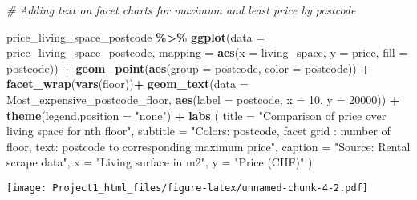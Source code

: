 \documentclass[
]{article}
\newenvironment{Shaded}{\begin{snugshade}}{\end{snugshade}}
\newcommand{\AttributeTok}[1]{\textcolor[rgb]{0.13,0.29,0.53}{#1}}
\newcommand{\CommentTok}[1]{\textcolor[rgb]{0.56,0.35,0.01}{\textit{#1}}}
\newcommand{\DecValTok}[1]{\textcolor[rgb]{0.00,0.00,0.81}{#1}}
\newcommand{\FunctionTok}[1]{\textcolor[rgb]{0.13,0.29,0.53}{\textbf{#1}}}
\newcommand{\NormalTok}[1]{#1}
\newcommand{\SpecialCharTok}[1]{\textcolor[rgb]{0.81,0.36,0.00}{\textbf{#1}}}
\newcommand{\StringTok}[1]{\textcolor[rgb]{0.31,0.60,0.02}{#1}}
\begin{document}
\begin{Shaded}
\begin{Highlighting}[]
\CommentTok{\# Adding text on facet charts for maximum and least price by postcode}

\NormalTok{price\_living\_space\_postcode }\SpecialCharTok{\%\textgreater{}\%}
  \FunctionTok{ggplot}\NormalTok{(}\AttributeTok{data =}\NormalTok{ price\_living\_space\_postcode,}
         \AttributeTok{mapping =} \FunctionTok{aes}\NormalTok{(}\AttributeTok{x =}\NormalTok{ living\_space, }\AttributeTok{y =}\NormalTok{ price, }\AttributeTok{fill =}\NormalTok{ postcode)) }\SpecialCharTok{+}
  \FunctionTok{geom\_point}\NormalTok{(}\FunctionTok{aes}\NormalTok{(}\AttributeTok{group =}\NormalTok{ postcode, }\AttributeTok{color =}\NormalTok{ postcode)) }\SpecialCharTok{+} \FunctionTok{facet\_wrap}\NormalTok{(}\FunctionTok{vars}\NormalTok{(floor))}\SpecialCharTok{+}
  \FunctionTok{geom\_text}\NormalTok{(}\AttributeTok{data =}\NormalTok{ Most\_expensive\_postcode\_floor,}
            \FunctionTok{aes}\NormalTok{(}\AttributeTok{label =}\NormalTok{ postcode, }\AttributeTok{x =} \DecValTok{10}\NormalTok{, }\AttributeTok{y =} \DecValTok{20000}\NormalTok{)) }\SpecialCharTok{+}
  \FunctionTok{theme}\NormalTok{(}\AttributeTok{legend.position =} \StringTok{"none"}\NormalTok{) }\SpecialCharTok{+}
  \FunctionTok{labs}\NormalTok{ (}
    \AttributeTok{title =} \StringTok{"Comparison of price over living space for nth floor"}\NormalTok{,}
    \AttributeTok{subtitle =} \StringTok{"Colors: postcode,  facet grid : number of floor,}
\StringTok{    text: postcode to corresponding maximum price"}\NormalTok{,}
    \AttributeTok{caption =} \StringTok{"Source: Rental scrape data"}\NormalTok{,}
    \AttributeTok{x =} \StringTok{"Living surface in m2"}\NormalTok{,}
    \AttributeTok{y =} \StringTok{"Price (CHF)"}
\NormalTok{  )}
\end{Highlighting}
\end{Shaded}

\texttt{[image: Project1\_html\_files/figure-latex/unnamed-chunk-4-2.pdf]}
\end{document}
